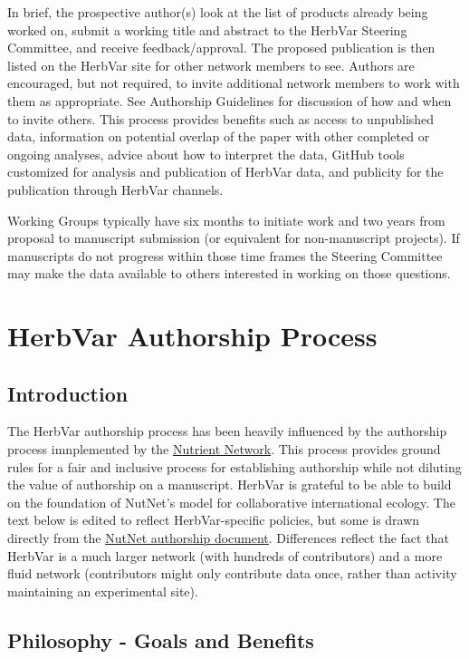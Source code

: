 \documentclass[
  letterpaper,
  oneside,
  open=any]{scrbook}
\begin{document}
In brief, the prospective author(s) look at the list of products already
being worked on, submit a working title and abstract to the HerbVar
Steering Committee, and receive feedback/approval. The proposed
publication is then listed on the HerbVar site for other network members
to see. Authors are encouraged, but not required, to invite additional
network members to work with them as appropriate. See Authorship
Guidelines for discussion of how and when to invite others. This process
provides benefits such as access to unpublished data, information on
potential overlap of the paper with other completed or ongoing analyses,
advice about how to interpret the data, GitHub tools customized for
analysis and publication of HerbVar data, and publicity for the
publication through HerbVar channels.

Working Groups typically have six months to initiate work and two years
from proposal to manuscript submission (or equivalent for non-manuscript
projects). If manuscripts do not progress within those time frames the
Steering Committee may make the data available to others interested in
working on those questions.

\chapter{HerbVar Authorship Process}\label{sec-authorship_process}

\section{Introduction}\label{introduction}

The HerbVar authorship process has been heavily influenced by the
authorship process imnplemented by the
\href{https://nutnet.org}{Nutrient Network}. This process provides
ground rules for a fair and inclusive process for establishing
authorship while not diluting the value of authorship on a manuscript.
HerbVar is grateful to be able to build on the foundation of NutNet's
model for collaborative international ecology. The text below is edited
to reflect HerbVar-specific policies, but some is drawn directly from
the \href{https://nutnet.org/authorship}{NutNet authorship document}.
Differences reflect the fact that HerbVar is a much larger network (with
hundreds of contributors) and a more fluid network (contributors might
only contribute data once, rather than activity maintaining an
experimental site).

\section{Philosophy - Goals and
Benefits}\label{philosophy---goals-and-benefits}
\end{document}
